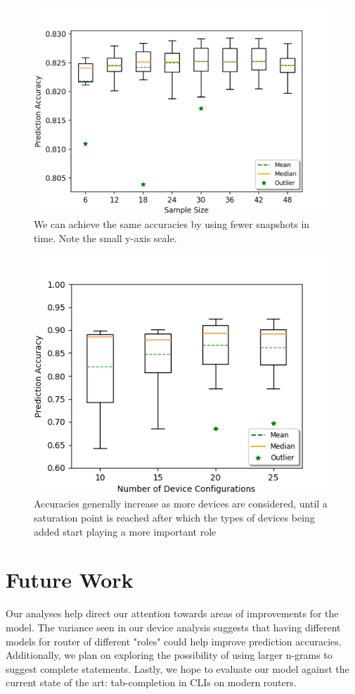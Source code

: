 \begin{figure}
	\centering
	\includegraphics[width=\columnwidth]{monthly_analysis.png}
	\caption{We can achieve the same accuracies by using fewer snapshots in time. Note the small y-axis scale.}
    \label{fig:umn_analysis}
\end{figure}

\begin{figure}
	\centering
	\includegraphics[width=\columnwidth]{device_analysis.png}
	\caption{Accuracies generally increase as more devices are considered, until a saturation point is reached after which the types of devices being added start playing a more important role}
    \label{fig:umn_analysis}
\end{figure}

\section{Future Work}

Our analyses help direct our attention towards areas of improvements for the model. The variance seen in our device analysis suggests that having different models for router of different "roles" could help improve prediction accuracies. Additionally, we plan on exploring the possibility of using larger n-grams to suggest complete statements. Lastly, we hope to evaluate our model against the current state of the art: tab-completion in CLIs on modern routers.
